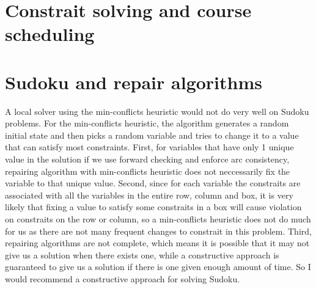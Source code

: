 \documentclass[11pt]{article}
\begin{document}
\begin{onehalfspace}
\section{Constrait solving and course scheduling}
\section{Sudoku and repair algorithms}
A local solver using the min-conflicts heuristic would not do very well on Sudoku problems. For the min-conflicts heuristic, the algorithm generates a random initial state and then picks a random variable and tries to change it to a value that can satisfy most constraints. First, for variables that have only 1 unique value in the solution if we use forward checking and enforce arc consistency, repairing algorithm with min-conflicts heuristic does not neccessarily fix the variable to that unique value. Second, since for each variable the constraits are associated with all the variables in the entire row, column and box, it is very likely that fixing a value to satisfy some constraits in a box will cause violation on constraits on the row or column, so a min-conflicts heuristic does not do much for us as there are not many frequent changes to constrait in this problem. Third, repairing algorithms are not complete, which means it is possible that it may not give us a solution when there exists one, while a constructive approach is guaranteed to give us a solution if there is one given enough amount of time. So I would recommend a constructive approach for solving Sudoku.
\end{onehalfspace}
\end{document}
